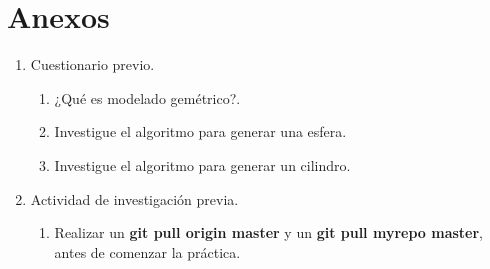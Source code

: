 \documentclass[11pt, english]{article}
\begin{document}
\section{Anexos}
\begin{enumerate}
\item Cuestionario previo.
\begin{enumerate}
\item ¿Qué es modelado gemétrico?.
\item Investigue el algoritmo para generar una esfera.
\item Investigue el algoritmo para generar un cilindro.
\end{enumerate}
\item Actividad de investigación previa.
\begin{enumerate}
\item Realizar un \textbf{git pull origin master} y un \textbf{git pull myrepo master}, antes de comenzar la práctica.
\end{enumerate}
\end{enumerate}

\end{document}
